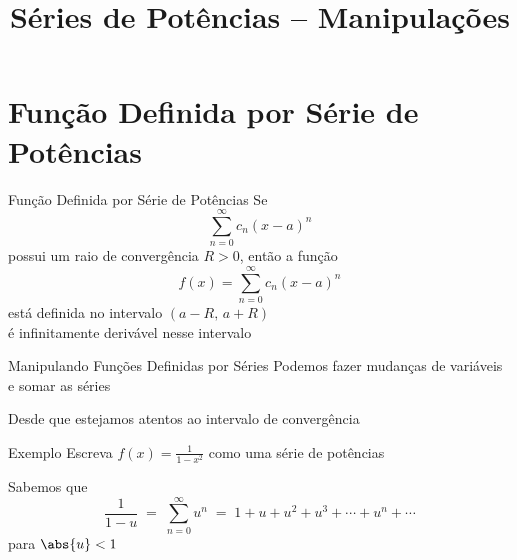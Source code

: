 
\usepackage{integracao_e_series}
\DeclareMathOperator{\bessel}{J}

\title{Séries de Potências -- Manipulações}



\addtitle

\section{Função Definida por Série de Potências}

\begin{frame}{Função Definida por Série de Potências}
  Se
  \[
    \sum_{n=0}^\infty c_n (x-a)^n
  \]
  \pause
  possui um raio de convergência \(R>0\),
  \pause
  então a função
  \[
    f(x)=\sum_{n=0}^\infty c_n(x-a)^n
  \]
  \pause
  está definida no intervalo $(a-R,\,a+R)$ \\[3mm] \pause
  é infinitamente derivável nesse intervalo
\end{frame}

\begin{frame}{Manipulando Funções Definidas por Séries}
  Podemos fazer mudanças de variáveis e somar as séries

  \pause
  \vspace{2\baselineskip}
  Desde que estejamos atentos ao intervalo de convergência
\end{frame}

\addtocounter{exemplo}{1}
\begin{frame}{Exemplo \theexemplo}
  Escreva \(f(x) = \frac{1}{1-x^2}\) como uma série de potências

  \pause
  \vspace{\baselineskip}
  Sabemos que
  \[
    \frac{1}{1-u}
    \;=\; \sum_{n=0}^\infty u^n
    \;=\; 1 + u + u^2 + u^3 + \cdots + u^n + \cdots
  \]
  para \(\abs{u}<1\)
\end{frame}

